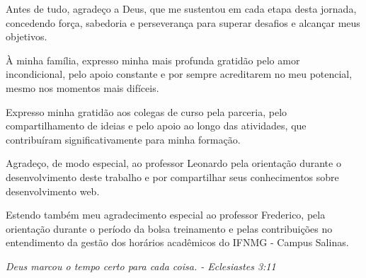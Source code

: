 \documentclass[
	12pt,				%
	twoside,			%
	a4paper,			%
	chapter=TITLE,		%
	section=TITLE,		%
	subsection=TITLE,	%
	subsubsection=TITLE,%
	english,			%
	french,				%
	spanish,			%
	brazil,				%
	]{abntex2}
\date{\normalsize\today} %
\begin{document}
\frenchspacing          %

\pretextual

\imprimircapa                   

\imprimirfolhaderosto

\newpage

\begin{agradecimentos}

Antes de tudo, agradeço a Deus, que me sustentou em cada etapa desta jornada, concedendo força, sabedoria e perseverança para superar desafios e alcançar meus objetivos.

À minha família, expresso minha mais profunda gratidão pelo amor incondicional, pelo apoio constante e por sempre acreditarem no meu potencial, mesmo nos momentos mais difíceis.

Expresso minha gratidão aos colegas de curso pela parceria, pelo compartilhamento de ideias e pelo apoio ao longo das atividades, que contribuíram significativamente para minha formação.

Agradeço, de modo especial, ao professor Leonardo pela orientação durante o desenvolvimento deste trabalho e por compartilhar seus conhecimentos sobre desenvolvimento web.

Estendo também meu agradecimento especial ao professor Frederico, pela orientação durante o período da bolsa treinamento e pelas contribuições no entendimento da gestão dos horários acadêmicos do IFNMG - Campus Salinas.

\end{agradecimentos}

\begin{epigrafe}
    \vspace*{\fill}
	\begin{flushright}
		\textit{Deus marcou o tempo certo para cada coisa. - Eclesiastes 3:11}
	\end{flushright}
\end{epigrafe}

\setlength{\absparsep}{18pt} %
\end{document}
